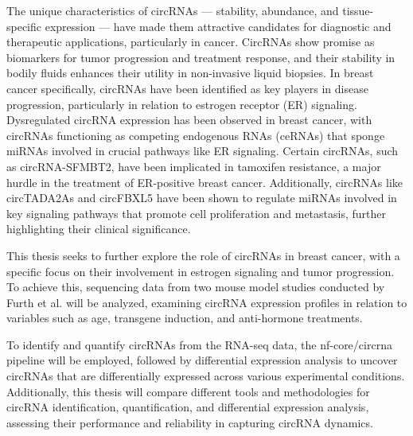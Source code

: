 The unique characteristics of circRNAs — stability, abundance, and
tissue-specific expression — have made them attractive candidates for
diagnostic and therapeutic applications, particularly in cancer.
CircRNAs show promise as biomarkers for tumor progression and treatment
response\supercite{bao_prognostic_2020,ren_construction_2017}, and their
stability in bodily fluids enhances their utility in non-invasive liquid
biopsies\supercite{bao_prognostic_2020,zhang_circular_2018}.
In breast cancer specifically, circRNAs have been identified as key players in
disease progression, particularly in relation to estrogen receptor (ER)
signaling.
Dysregulated circRNA expression has been observed in breast cancer, with
circRNAs functioning as competing endogenous RNAs (ceRNAs) that sponge miRNAs
involved in crucial pathways like ER
signaling\supercite{nair_circular_2016,xu_circrna_2022}.
Certain circRNAs, such as circRNA-SFMBT2, have been implicated in tamoxifen
resistance, a major hurdle in the treatment of ER-positive breast
cancer\supercite{li_circrna-sfmbt2_2023}.
Additionally, circRNAs like circTADA2As and circFBXL5 have been shown to
regulate miRNAs involved in key signaling pathways that promote cell
proliferation and metastasis, further highlighting their clinical
significance\supercite{xu_circtada2as_2019,gao_hsa_circrna_0006528_2019}.

This thesis seeks to further explore the role of circRNAs in breast cancer,
with a specific focus on their involvement in estrogen signaling and tumor
progression.
To achieve this, sequencing data from two mouse model studies conducted by
Furth et al.
\supercite{furth_esr1_2023,furth_overexpression_2023}
will be analyzed, examining circRNA expression profiles in relation to
variables such as age, transgene induction, and anti-hormone treatments.

To identify and quantify circRNAs from the RNA-seq data, the nf-core/circrna
pipeline\supercite{digby_nf-corecircrna_2023} will be employed, followed by
differential expression analysis to uncover circRNAs that are differentially
expressed across various experimental conditions.
Additionally, this thesis will compare different tools and methodologies for
circRNA identification, quantification, and differential expression analysis,
assessing their performance and reliability in capturing circRNA dynamics.

